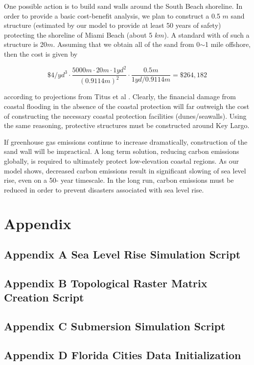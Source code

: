 \documentclass[12pt,a4paper,titlepage]{article}
\begin{document}
One possible action is to build sand walls around the South Beach
shoreline. In order to provide a basic cost-benefit analysis, we
plan to construct a 0.5 $m$ sand structure (estimated by our model
to provide at least 50 years of safety) protecting the shoreline
of Miami Beach (about 5 $km$). A standard with of such a structure
is 20$m$. Assuming that we obtain all of the sand from 0$\sim$1
mile offshore, then the cost is given by

\[
\$4/yd^3\cdot\frac{5000m\cdot20m\cdot1yd^2}{(0.9114m)^2}\cdot\frac{0.5m}{1yd/0.9114m}=\$264,182
\]

according to projections from Titus et al . Clearly, the financial
damage from coastal flooding in the absence of the coastal
protection will far outweigh the cost of constructing the
necessary coastal protection facilities (dunes/seawalls). Using
the same reasoning, protective structures must be constructed
around Key Largo.

If greenhouse gas emissions continue to increase dramatically,
construction of the sand wall will be impractical. A long term
solution, reducing carbon emissions globally, is required to
ultimately protect low-elevation coastal regions. As our model
shows, decreased carbon emissions result in significant slowing of
sea level rise, even on a 50- year timescale. In the long run,
carbon emissions must be reduced in order to prevent disasters
associated with sea level rise.

\newpage
\begin{thebibliography}{1}




\end{thebibliography}
\newpage



\section{Appendix}

\subsection{Appendix A Sea Level Rise Simulation Script}



\newpage
\subsection{Appendix B Topological Raster Matrix Creation Script}



\newpage
\subsection{Appendix C Submersion Simulation Script}


\newpage

\subsection{Appendix D Florida Cities Data Initialization}

\end{document}
